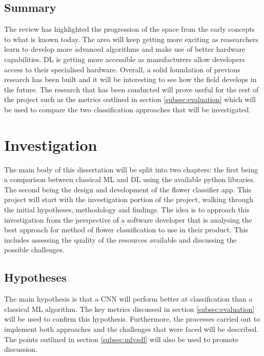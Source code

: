 \documentclass[12pt,a4paper]{report}
\begin{document}
\section{Summary}

The review has highlighted the progression of the space from the early concepts to what is known today. 
The area will keep getting more exciting as reasearchers learn to develop more advanced
algorithms and make use of better hardware capabilities. DL is getting more
accessible as manufacturers allow developers access to their specialised hardware.
Overall, a solid foundation of previous research has been built and it will be interesting 
to see how the field develops in the future. The research that has been conducted will prove useful for the rest of the 
project such as the metrics outlined in section \ref{subsec:evaluation} which will be used to compare the 
two classification approaches that will be investigated.

\clearpage

\chapter{Investigation}

\label{chap:invest}

The main body of this dissertation will be split into two chapters: the first being a comparison
between classical ML and DL using the available python libraries. The second being 
the design and development of the flower classifier app. This project will start with the investigation portion of the project,
walking through the initial hypotheses, methodology and findings. The idea is to approach this investigation from the 
perspective of a software developer that is analysing the best approach for method of flower classification to use in 
their product. This includes assessing the quality of the resources available and discussing the possible challenges.

\section{Hypotheses}

The main hypothesis is that a CNN will perform better at classification than a classical ML algorithm. The key metrics 
discussed in section \ref{subsec:evaluation} will be used to confirm this hypothesis. Furthermore, the processes carried
out to implement both approaches and the challenges that were faced will be described. The points outlined in section 
\ref{subsec:mlvsdl} will also be used to promote discussion. 
\end{document}
